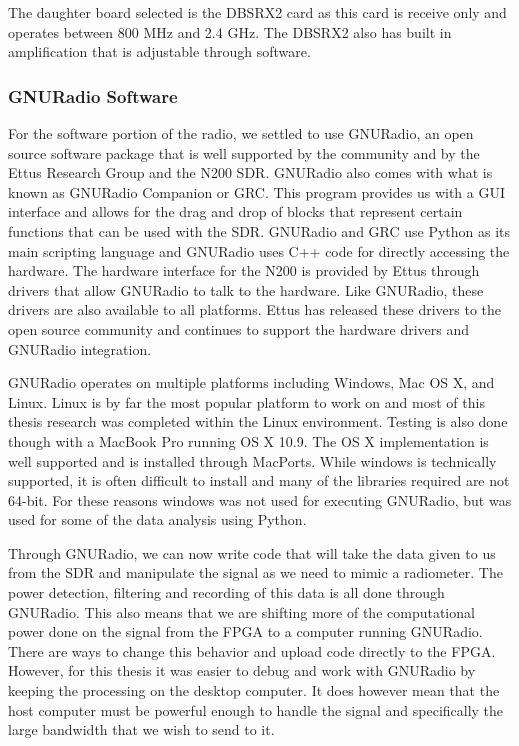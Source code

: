 The daughter board selected is the DBSRX2 card as this card is receive only and operates between 800 MHz and 2.4 GHz.  The DBSRX2 also has built in amplification that is adjustable through software.

\subsubsection{GNURadio Software}

For the software portion of the radio, we settled to use GNURadio, an open source software package that is well supported by the community and by the Ettus Research Group and the N200 SDR.  GNURadio also comes with what is known as GNURadio Companion or GRC.  This program provides us with a GUI interface and allows for the drag and drop of blocks that represent certain functions that can be used with the SDR.  GNURadio and GRC use Python as its main scripting language and GNURadio uses C++ code for directly accessing the hardware.  The hardware interface for the N200 is provided by Ettus through drivers that allow GNURadio to talk to the hardware.  Like GNURadio, these drivers are also available to all platforms.  Ettus has released these drivers to the open source community and continues to support the hardware drivers and GNURadio integration.

GNURadio operates on multiple platforms including Windows, Mac OS X, and Linux.  Linux is by far the most popular platform to work on and most of this thesis research was completed within the Linux environment.  Testing is also done though with a MacBook Pro running OS X 10.9.  The OS X implementation is well supported and is installed through MacPorts.  While windows is technically supported, it is often difficult to install and many of the libraries required are not 64-bit.  For these reasons windows was not used for executing GNURadio, but was used for some of the data analysis using Python.

Through GNURadio, we can now write code that will take the data given to us from the SDR and manipulate the signal as we need to mimic a radiometer.  The power detection, filtering and recording of this data is all done through GNURadio.  This also means that we are shifting more of the computational power done on the signal from the FPGA to a computer running GNURadio.  There are ways to change this behavior and upload code directly to the FPGA.  However, for this thesis it was easier to debug and work with GNURadio by keeping the processing on the desktop computer.  It does however mean that the host computer must be powerful enough to handle the signal and specifically the large bandwidth that we wish to send to it.  

